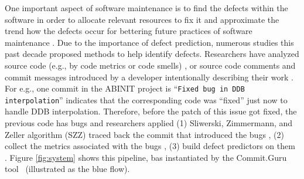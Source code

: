 \documentclass[sigconf,review, anonymous]{acmart}
\begin{document}



One important aspect of software maintenance is to find the defects within the software in order to allocate relevant resources to fix it and  approximate the trend how the defects occur for bettering future practices of software maintenance \cite{menzies10dp, menzies07dp, ambros10extensive, nagappan05codechurn,elbaum00codechurn, moser08changemetrics, hassan09codechanges}.  Due to the importance of defect prediction, numerous studies this past decade proposed methods to help identify defects. Researchers have analyzed source code (e.g., by code metrics or code smells) \cite{menzies07defect, menzies10dp, ambros10extensive}, or source code comments and commit messages introduced by a developer intentionally describing their work \cite{mockus00changeskeys, hindle08_largecommits, Kim08changes, kamei12_jit}. For e.g., one commit in the ABINIT project is ``\texttt{Fixed bug in DDB interpolation}'' indicates that the corresponding code was ``fixed'' just now to handle DDB interpolation. Therefore, before the patch of this issue got fixed, the previous code has bugs and researchers applied  (1) Sliwerski, Zimmermann, and Zeller algorithm (SZZ)  traced back the commit that introduced the bugs \cite{costa17szz, Kim08changes, Sliwerski05changes}, (2) collect the metrics associated with the bugs \cite{menzies07dp, commitguru, kamei12_jit}, (3) build defect predictors on them \cite{agrawal2018better, di18_fft, Tu18Tuning, ghotra15}. 
Figure \ref{fig:system} shows this pipeline,
bas instantiated by the Commit.Guru tool~\cite{commitguru} (illustrated as the blue flow). 
\end{document}
